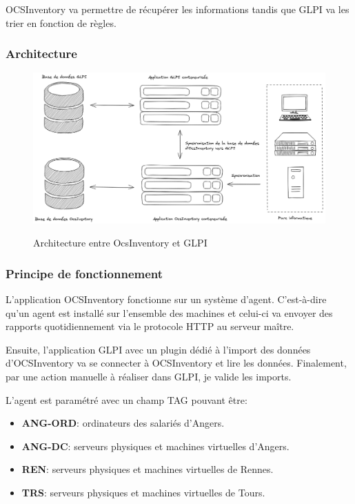 \documentclass[12pt]{article}
\begin{document}
OCSInventory va permettre de récupérer les informations tandis que GLPI va les trier en fonction de règles.

\subsubsection{Architecture}
\begin{figure}[!ht]
    \centering
    \includegraphics[width=\textwidth]{src/Fonctionne GLPI.png}
    \label{fig:glpi}
    \caption{Architecture entre OcsInventory et GLPI}
\end{figure}

\newpage
\subsubsection{Principe de fonctionnement}
L'application OCSInventory fonctionne sur un système d'agent.
C'est-à-dire qu'un agent est installé sur l'ensemble des machines et celui-ci va envoyer des rapports quotidiennement via le protocole HTTP au serveur maître. 

Ensuite, l'application GLPI avec un plugin dédié à l'import des données d'OCSInventory va se connecter à OCSInventory et lire les données.
Finalement, par une action manuelle à réaliser dans GLPI, je valide les imports.

L'agent est paramétré avec un champ TAG pouvant être:
\begin{itemize}
    \item \textbf{ANG-ORD}: ordinateurs des salariés d'Angers.
    \item \textbf{ANG-DC}: serveurs physiques et machines virtuelles d'Angers.
    \item \textbf{REN}: serveurs physiques et machines virtuelles de Rennes.
    \item \textbf{TRS}: serveurs physiques et machines virtuelles de Tours.
\end{itemize}
\end{document}
